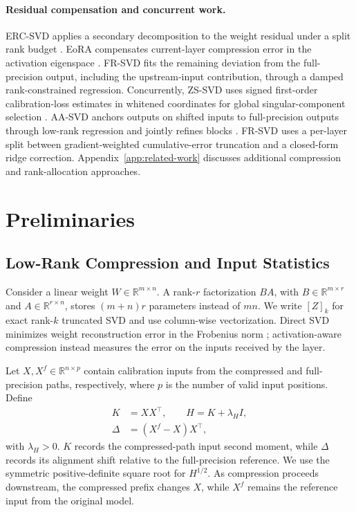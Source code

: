 \documentclass[11pt]{article}
\begin{document}
\paragraph{Residual compensation and concurrent work.}
ERC-SVD applies a secondary decomposition to the weight residual under a split rank budget \citep{bai2025ercsvd}. EoRA compensates current-layer compression error in the activation eigenspace \citep{liu2025eora}. FR-SVD fits the remaining deviation from the full-precision output, including the upstream-input contribution, through a damped rank-constrained regression. Concurrently, ZS-SVD uses signed first-order calibration-loss estimates in whitened coordinates for global singular-component selection \citep{abbasi2026zssvd}. AA-SVD anchors outputs on shifted inputs to full-precision outputs through low-rank regression and jointly refines blocks \citep{sinha2026aasvd}. FR-SVD uses a per-layer split between gradient-weighted cumulative-error truncation and a closed-form ridge correction. Appendix~\ref{app:related-work} discusses additional compression and rank-allocation approaches.

\section{Preliminaries}\label{sec:preliminaries}

\subsection{Low-Rank Compression and Input Statistics}

Consider a linear weight $W\in\mathbb R^{m\times n}$. A rank-$r$ factorization $BA$, with $B\in\mathbb R^{m\times r}$ and $A\in\mathbb R^{r\times n}$, stores $(m+n)r$ parameters instead of $mn$. We write $[Z]_k$ for exact rank-$k$ truncated SVD and use column-wise vectorization. Direct SVD minimizes weight reconstruction error in the Frobenius norm \citep{eckart1936eym}; activation-aware compression instead measures the error on the inputs received by the layer.

Let $X,X^f\in\mathbb R^{n\times p}$ contain calibration inputs from the compressed and full-precision paths, respectively, where $p$ is the number of valid input positions. Define
\begin{equation}
\begin{aligned}
K&=XX^\top,\qquad H=K+\lambda_H I,\\
\Delta&=(X^f-X)X^\top,
\end{aligned}
\label{eq:input-statistics}
\end{equation}
with $\lambda_H>0$. $K$ records the compressed-path input second moment, while $\Delta$ records its alignment shift relative to the full-precision reference. We use the symmetric positive-definite square root for $H^{1/2}$. As compression proceeds downstream, the compressed prefix changes $X$, while $X^f$ remains the reference input from the original model.
\end{document}
